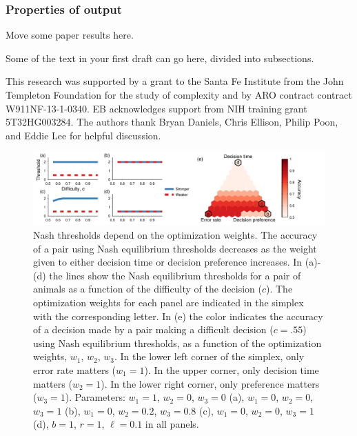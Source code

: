 \documentclass{pnastwo}
\begin{document}
\begin{article}
\subsubsection{Properties of output}
Move some paper results here.

Some of the text in your first draft can go here, divided into subsections.
\label{additionaldiscussion}


\begin{acknowledgments}
This research was supported by a grant to the Santa Fe Institute from the John Templeton Foundation for the study of complexity and by ARO contract contract W911NF-13-1-0340. EB acknowledges support from NIH training grant 5T32HG003284. The authors thank Bryan Daniels, Chris Ellison, Philip Poon, and Eddie Lee for helpful discussion. 
\end{acknowledgments}

%  



\end{article}

\begin{figure}[ht]
\includegraphics[width=6.83in]{Figure1.pdf}
\caption{\label{nasheq} Nash thresholds depend on the optimization weights. The accuracy of a pair using Nash equilibrium thresholds decreases as the weight given to either decision time or decision preference increases.  In (a)-(d) the lines show the Nash equilibrium thresholds for a pair of animals as a function of the difficulty of the decision ($c$). The optimization weights for each panel are indicated in the simplex with the corresponding letter. In (e) the color indicates the accuracy of a decision made by a pair making a difficult decision ($c=.55$) using Nash equilibrium thresholds, as a function of the optimization weights, $w_1$, $w_2$, $w_3$.  In the lower left corner of the simplex, only error rate matters ($w_1=1$).  In the upper corner, only decision time matters ($w_2=1$).  In the lower right corner, only preference matters ($w_3=1$). Parameters: $w_1=1$, $w_2=0$, $w_3=0$ (a), $w_1=0$, $w_2=0$, $w_3=1$ (b), $w_1=0$, $w_2=0.2$, $w_3=0.8$ (c), $w_1=0$, $w_2=0$, $w_3=1$ (d), $b=1$, $r=1$, $\ell=0.1$ in all panels. }
\end{figure}
\end{document}
